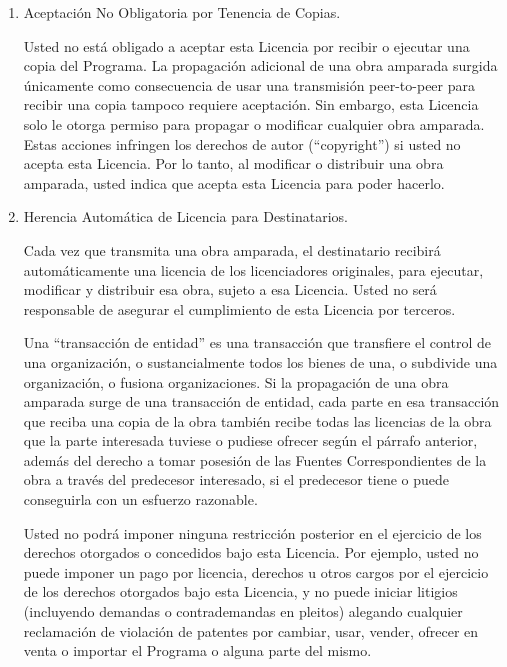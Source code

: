 {\begin{enumerate}
La cancelaci\'{o}n de sus derechos bajo esta secci\'{o}n no da por
canceladas las licencias de terceros que hayan recibido copias o
derechos de usted bajo esta Licencia.  Si sus derechos han sido
cancelados y no fueran renovados de manera permanente, usted no
cumple los requisitos para recibir nuevas licencias para el mismo
material bajo la secci\'{o}n 10.

\item Aceptaci\'{o}n No Obligatoria por Tenencia de Copias.

Usted no est\'{a} obligado a aceptar esta Licencia por recibir o
ejecutar una copia del Programa.  La propagaci\'{o}n adicional de una obra amparada surgida \'{u}nicamente como consecuencia de usar una transmisi\'{o}n peer-to-peer para recibir una copia tampoco requiere aceptaci\'{o}n.  Sin embargo, esta Licencia solo le otorga
permiso para propagar o modificar cualquier obra amparada.  Estas
acciones infringen los derechos de autor (``copyright'') si usted no acepta esta Licencia.  Por lo tanto, al modificar o distribuir una obra amparada, usted
indica que acepta esta Licencia para poder hacerlo.

\item Herencia Autom\'{a}tica de Licencia para Destinatarios.

Cada vez que transmita una obra amparada, el destinatario recibir\'{a} 
autom\'{a}ticamente una licencia de los licenciadores originales, para 
ejecutar, modificar y distribuir esa obra, sujeto a esa Licencia. 
Usted no ser\'{a} responsable de asegurar el cumplimiento de esta Licencia 
por terceros.

Una ``transacci\'{o}n de entidad'' es una transacci\'{o}n que transfiere el 
control de una organizaci\'{o}n, o sustancialmente todos los bienes de una, 
o subdivide una organizaci\'{o}n, o fusiona organizaciones. Si la 
propagaci\'{o}n de una obra amparada surge de una transacci\'{o}n de entidad, 
cada parte en esa transacci\'{o}n que reciba una copia de la obra tambi\'{e}n 
recibe todas las licencias de la obra que la parte interesada tuviese 
o pudiese ofrecer seg\'{u}n el p\'{a}rrafo anterior, adem\'{a}s del derecho a tomar 
posesi\'{o}n de las Fuentes Correspondientes de la obra a trav\'{e}s del 
predecesor interesado, si el predecesor tiene o puede conseguirla 
con un esfuerzo razonable.

Usted no podr\'{a} imponer ninguna restricci\'{o}n posterior en el ejercicio 
de los derechos otorgados o concedidos bajo esta Licencia. Por ejemplo, 
usted no puede imponer un pago por licencia, derechos u otros cargos 
por el ejercicio de los derechos otorgados bajo esta Licencia, y no 
puede iniciar litigios (incluyendo demandas o contrademandas en 
pleitos) alegando cualquier reclamaci\'{o}n de violaci\'{o}n de patentes por 
cambiar, usar, vender, ofrecer en venta o importar el Programa o 
alguna parte del mismo.


\end{enumerate}}
